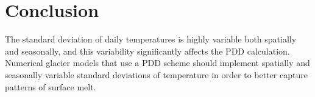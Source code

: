 \documentclass[twocolumn]{igs}
\begin{document}
\section{Conclusion}

The standard deviation of daily temperatures is highly variable both spatially and seasonally, and this variability significantly affects the PDD calculation. Numerical glacier models that use a PDD scheme should implement spatially and seasonally variable standard deviations of temperature in order to better capture patterns of surface melt.



\end{document}
